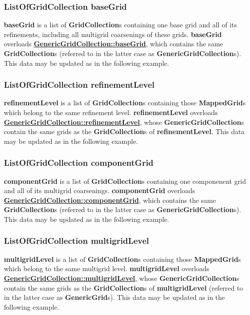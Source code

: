 \documentclass{article}
\begin{document}
  \subsubsection{ListOfGridCollection baseGrid}
  \label{GridCollection::baseGrid}
    \textbf{baseGrid} is
    a list of \textbf{GridCollection}s containing one base grid and all of its refinements, including all multigrid coarsenings of these grids.
    \textbf{baseGrid} overloads
    {\bf{}\hyperref{GenericGridCollection::baseGrid}{GenericGridCollection::baseGrid \rm(\S}{)}{GenericGridCollection::baseGrid}},
    which contains the same \textbf{GridCollection}s (referred to in the latter case as \textbf{GenericGridCollection}s).
    This data may be updated as in the following example.

  \subsubsection{ListOfGridCollection refinementLevel}
  \label{GridCollection::refinementLevel}
    \textbf{refinementLevel} is a list of \textbf{GridCollection}s containing those \textbf{MappedGrid}s which belong to the same refinement level.
    \textbf{refinementLevel} overloads
    {\bf{}\hyperref{GenericGridCollection::refinementLevel}{GenericGridCollection::refinementLevel \rm(\S}{)}{GenericGridCollection::refinementLevel}},
    whose \textbf{GenericGridCollection}s contain the same grids as the \textbf{GridCollection}s of \textbf{refinementLevel}.
    This data may be updated as in the following example.

  \subsubsection{ListOfGridCollection componentGrid}
  \label{GridCollection::componentGrid}
    \textbf{componentGrid} is a list of \textbf{GridCollection}s containing one componenent grid and all of its multigrid coarsenings.
    \textbf{componentGrid} overloads
    {\bf{}\hyperref{GenericGridCollection::componentGrid}{GenericGridCollection::componentGrid \rm(\S}{)}{GenericGridCollection::componentGrid}},
    which contains the same \textbf{GridCollection}s (referred to in the latter case as \textbf{GenericGridCollection}s).
    This data may be updated as in the following example.

  \subsubsection{ListOfGridCollection multigridLevel} 
  \label{GridCollection::multigridLevel} 
    \textbf{multigridLevel} is a list of \textbf{GridCollection}s containing those \textbf{MappedGrid}s which belong to the same multigrid level.
    \textbf{multigridLevel} overloads
    {\bf{}\hyperref{GenericGridCollection::multigridLevel}{GenericGridCollection::multigridLevel \rm(\S}{)}{GenericGridCollection::multigridLevel}},
    whose \textbf{GenericGridCollection}s contain the same grids as the \textbf{GridCollection}s of \textbf{multigridLevel}
    (referred to in the latter case as \textbf{GenericGrid}s).
    This data may be updated as in the following example.
\end{document}
